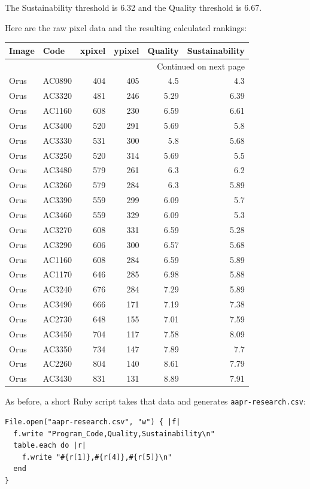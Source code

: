 \documentclass[article,10pt,microtype]{article}
\begin{document}
The Sustainability threshold is 6.32 and the Quality threshold is 6.67.

Here are the raw pixel data and the resulting calculated rankings:

\begin{longtable}{llrrrr}
\label{research}
\\
Image & Code & xpixel & ypixel & Quality & Sustainability\\
\hline
\endhead
\hline\multicolumn{6}{r}{Continued on next page} \\
\endfoot
\endlastfoot
Orus & AC0890 & 404 & 405 & 4.5 & 4.3\\
Orus & AC3320 & 481 & 246 & 5.29 & 6.39\\
Orus & AC1160 & 608 & 230 & 6.59 & 6.61\\
Orus & AC3400 & 520 & 291 & 5.69 & 5.8\\
Orus & AC3330 & 531 & 300 & 5.8 & 5.68\\
Orus & AC3250 & 520 & 314 & 5.69 & 5.5\\
Orus & AC3480 & 579 & 261 & 6.3 & 6.2\\
Orus & AC3260 & 579 & 284 & 6.3 & 5.89\\
Orus & AC3390 & 559 & 299 & 6.09 & 5.7\\
Orus & AC3460 & 559 & 329 & 6.09 & 5.3\\
Orus & AC3270 & 608 & 331 & 6.59 & 5.28\\
Orus & AC3290 & 606 & 300 & 6.57 & 5.68\\
Orus & AC1160 & 608 & 284 & 6.59 & 5.89\\
Orus & AC1170 & 646 & 285 & 6.98 & 5.88\\
Orus & AC3240 & 676 & 284 & 7.29 & 5.89\\
Orus & AC3490 & 666 & 171 & 7.19 & 7.38\\
Orus & AC2730 & 648 & 155 & 7.01 & 7.59\\
Orus & AC3450 & 704 & 117 & 7.58 & 8.09\\
Orus & AC3350 & 734 & 147 & 7.89 & 7.7\\
Orus & AC2260 & 804 & 140 & 8.61 & 7.79\\
Orus & AC3430 & 831 & 131 & 8.89 & 7.91\\
\end{longtable}

As before, a short Ruby script takes that data and generates \texttt{aapr-research.csv}:

\begin{verbatim}
File.open("aapr-research.csv", "w") { |f|
  f.write "Program_Code,Quality,Sustainability\n"
  table.each do |r|
    f.write "#{r[1]},#{r[4]},#{r[5]}\n"
  end
}
\end{verbatim}
\end{document}
